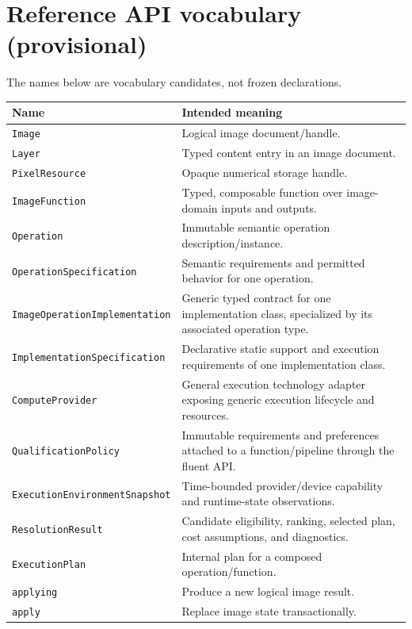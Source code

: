\documentclass[11pt,a4paper,oneside]{article}
\begin{document}
\section{Reference API vocabulary (provisional)}

The names below are vocabulary candidates, not frozen declarations.
\begin{longtable}{@{}L{0.28\textwidth}Z{0.66\textwidth}@{}}
\toprule
\textbf{Name} & \textbf{Intended meaning} \\
\midrule
\texttt{Image} & Logical image document/handle. \\
\texttt{Layer} & Typed content entry in an image document. \\
\texttt{PixelResource} & Opaque numerical storage handle. \\
\texttt{ImageFunction} & Typed, composable function over image-domain inputs and outputs. \\
\texttt{Operation} & Immutable semantic operation description/instance. \\
\texttt{OperationSpecification} & Semantic requirements and permitted behavior for one operation. \\
\texttt{ImageOperationImplementation} & Generic typed contract for one implementation class, specialized by its associated operation type. \\
\texttt{ImplementationSpecification} & Declarative static support and execution requirements of one implementation class. \\
\texttt{ComputeProvider} & General execution technology adapter exposing generic execution lifecycle and resources. \\
\texttt{QualificationPolicy} & Immutable requirements and preferences attached to a function/pipeline through the fluent API. \\
\texttt{ExecutionEnvironmentSnapshot} & Time-bounded provider/device capability and runtime-state observations. \\
\texttt{ResolutionResult} & Candidate eligibility, ranking, selected plan, cost assumptions, and diagnostics. \\
\texttt{ExecutionPlan} & Internal plan for a composed operation/function. \\
\texttt{applying} & Produce a new logical image result. \\
\texttt{apply} & Replace image state transactionally. \\
\bottomrule
\end{longtable}
\end{document}
